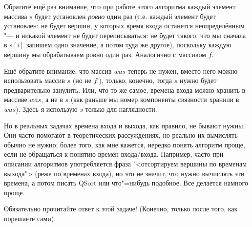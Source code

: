 Обратите ещё раз внимание, что при работе этого 
алгоритма каждый элемент массива $s$ будет установлен \textit{ровно} один раз (т.е. каждый элемент будет установлен:
не будет вершин, у которых время входа останется неопределённым "--- и никакой элемент не будет переписываться:
не будет такого, что мы сначала в $s[i]$ запишем одно значение, а потом туда же другое), поскольку
каждую вершину мы обрабатываем ровно один раз. Аналогично с массивом $f$.

Ещё обратите внимание, что массив $was$ теперь не нужен, вместо него можно использовать массив $s$ (но не $f$!),
только, конечно, тогда $s$ нужно будет предварительно занулить. Или, что то же самое, времена входа можно хранить 
в массиве $was$, а не в $s$ (как раньше мы номер компоненты связности хранили в $was$). Здесь я использую
$s$ только для наглядности.

Но в реальных задачах времена входа и выхода, как правило, не бывают нужны. Они часто помогают в теоретических 
рассуждениях, но реально их вычислять обычно не нужно; более того, как мне кажется, нередко понять алгоритм проще, если 
не обращаться к понятию времён входа/входа. Например, часто при описании алгоритмов употребляется фраза 
"<отсортируем вершины по временам выхода"> (реже по временах входа), но это не значит, что нужно вычислять эти 
времена, а потом писать QSort или что"=нибудь подобное. Все делается намного проще.
                      

Обязательно прочитайте ответ к этой задаче! (Конечно, только после того, как порешаете сами).
